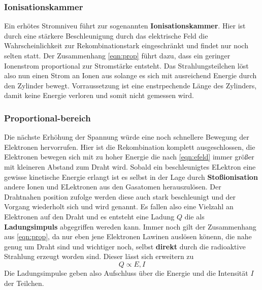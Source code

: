 \subsubsection{Ionisationskammer}
Ein erhötes Stromniveu führt zur sogenannten \textbf{Ionisationskammer}. Hier ist durch eine stärkere Beschleunigung durch das elektrische Feld die Wahrscheinlichkeit zur Rekombinationstark eingeschränkt und findet nur noch selten statt. 
Der Zusammenhang \eqref{eqn:prop} führt dazu, dass ein geringer Ionenstrom proportional zur Stromstärke entsteht.
Das Strahlungsteilchen löst also nun einen Strom an Ionen aus solange es sich mit ausreichend Energie durch den Zylinder bewegt. Vorraussetzung ist eine enstrpechende Länge des Zylinders, damit keine Energie verloren und somit nicht gemessen wird.
\subsubsection{Proportional-bereich}
\label{sub:porpotional}
Die nächste Erhöhung der Spannung würde eine noch schnellere Bewegung der Elektronen hervorrufen. Hier ist die Rekombination komplett ausgeschlossen, die Elektronen bewegen sich mit zu hoher Energie die nach \eqref{eqn:efeld} immer größer mit kleineren Abstand zum Draht wird.
Sobald ein beschleunigtes ELektron eine gewisse kinetische Energie erlangt ist es selbst in der Lage durch \textbf{Stoßionisation} andere Ionen und ELektronen aus den Gasatomen herauszulösen. Der Drahtnahen position zufolge werden diese auch stark beschleunigt und der Vorgang wiederholt sich
und wird  genannt. Es fallen also eine Vielzahl an Elektronen auf den Draht und es entsteht eine Ladung $Q$ die als \textbf{Ladungsimpuls} abgegriffen wereden kann. 
Immer noch gilt der Zusammenhang aus \eqref{eqn:prop}, da nur eben jene Elektronen Lawinen auslösen könenn, die nahe genug um Draht sind und wichtiger noch, selbst \textbf{direkt} durch die radioaktive Strahlung erzeugt worden sind. Dieser lässt sich erweitern zu
\begin{equation}
\label{eqn:prop2}
Q \propto E, I
\end{equation}
Die Ladungsimpulse geben also Aufschluss über die Energie und die Intensität $I$ der Teilchen. 
